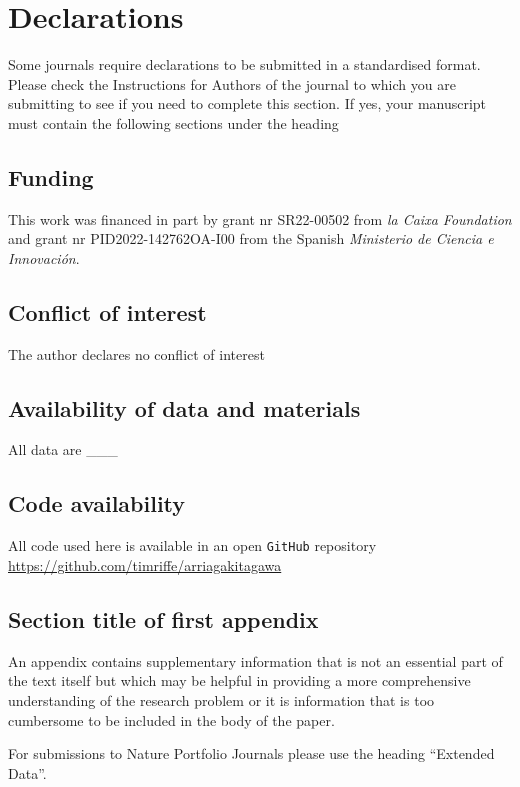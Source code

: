 \documentclass[sn-apa,pdflatex]{sn-jnl}
\theoremstyle{remark}
\theoremstyle{definition}
\begin{document}
\hypertarget{declarations}{%
\section*{Declarations}\label{declarations}}

Some journals require declarations to be submitted in a standardised
format. Please check the Instructions for Authors of the journal to
which you are submitting to see if you need to complete this section. If
yes, your manuscript must contain the following sections under the
heading

\hypertarget{funding}{%
\subsection{Funding}\label{funding}}

This work was financed in part by grant nr SR22-00502 from \emph{la
Caixa Foundation} and grant nr PID2022-142762OA-I00 from the Spanish
\emph{Ministerio de Ciencia e Innovación}.

\hypertarget{conflict-of-interest}{%
\subsection{Conflict of interest}\label{conflict-of-interest}}

The author declares no conflict of interest

\hypertarget{availability-of-data-and-materials}{%
\subsection{Availability of data and
materials}\label{availability-of-data-and-materials}}

All data are \_\_\_

\hypertarget{code-availability}{%
\subsection{Code availability}\label{code-availability}}

All code used here is available in an open \texttt{GitHub} repository
\url{https://github.com/timriffe/arriagakitagawa}

\begin{appendices}

\hypertarget{secA1}{%
\section{Section title of first appendix}\label{secA1}}

An appendix contains supplementary information that is not an essential
part of the text itself but which may be helpful in providing a more
comprehensive understanding of the research problem or it is information
that is too cumbersome to be included in the body of the paper.

For submissions to Nature Portfolio Journals please use the heading
``Extended Data''.

\end{appendices}


\end{document}
